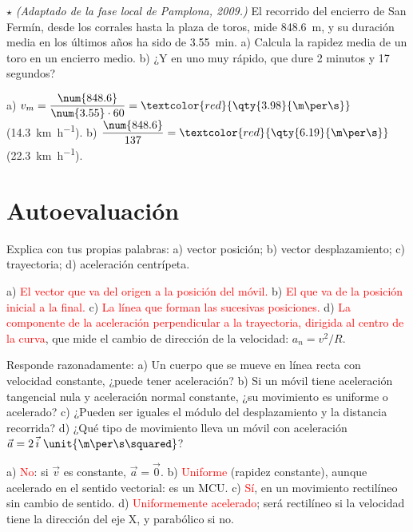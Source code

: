 \begin{exercise}
    \(\star\) \textit{(Adaptado de la fase local de Pamplona, 2009.)} El recorrido del encierro de San Fermín, desde los corrales hasta
    la plaza de toros, mide \qty{848.6}{\m}, y su duración media en los últimos años ha sido de \qty{3.55}{\minute}. a) Calcula la
    rapidez media de un toro en un encierro medio. b) ¿Y en uno muy rápido, que dure 2 minutos y 17 segundos?
    \begin{solu}
        a) \(v_m = \dfrac{\num{848.6}}{\num{3.55} \cdot 60} = \textcolor{red}{\qty{3.98}{\m\per\s}}\) (\qty{14.3}{\km\per\hour}).
        b) \(\dfrac{\num{848.6}}{137} = \textcolor{red}{\qty{6.19}{\m\per\s}}\) (\qty{22.3}{\km\per\hour}).
    \end{solu}
\end{exercise}

\section{Autoevaluación}\label{sec:ud8-autoevaluacion}

\begin{exercise}
    Explica con tus propias palabras: a) vector posición; b) vector desplazamiento; c) trayectoria; d) aceleración centrípeta.
    \begin{solu}
        a) \textcolor{red}{El vector que va del origen a la posición del móvil.} b) \textcolor{red}{El que va de la posición inicial a la
        final.} c) \textcolor{red}{La línea que forman las sucesivas posiciones.} d) \textcolor{red}{La componente de la aceleración
        perpendicular a la trayectoria, dirigida al centro de la curva}, que mide el cambio de dirección de la velocidad: \(a_n = v^2/R\).
    \end{solu}
\end{exercise}

\begin{exercise}
    Responde razonadamente: a) Un cuerpo que se mueve en línea recta con velocidad constante, ¿puede tener aceleración? b) Si un
    móvil tiene aceleración tangencial nula y aceleración normal constante, ¿su movimiento es uniforme o acelerado? c) ¿Pueden ser
    iguales el módulo del desplazamiento y la distancia recorrida? d) ¿Qué tipo de movimiento lleva un móvil con aceleración
    \(\vec a = 2\,\ivec~\unit{\m\per\s\squared}\)?
    \begin{solu}
        a) \textcolor{red}{No}: si \(\vec v\) es constante, \(\vec a = \vec 0\). b) \textcolor{red}{Uniforme} (rapidez constante),
        aunque acelerado en el sentido vectorial: es un MCU. c) \textcolor{red}{Sí}, en un movimiento rectilíneo sin cambio de sentido.
        d) \textcolor{red}{Uniformemente acelerado}; será rectilíneo si la velocidad tiene la dirección del eje X, y parabólico si no.
    \end{solu}
\end{exercise}

